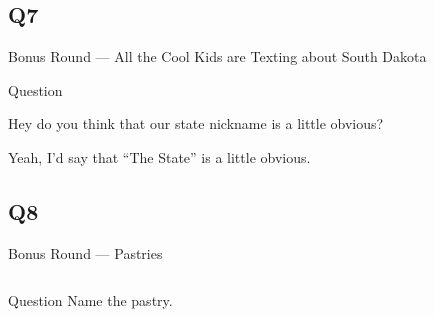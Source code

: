 \documentclass[11pt]{beamer}
\begin{document}
\subsection*{Q7}
\begin{frame}[t]{Bonus Round --- All the Cool Kids are Texting about South Dakota}
\begin{block}{Question}

\begin{minipage}{0.9\textwidth}
\begin{mdframed}[
    roundcorner=7pt,
    backgroundcolor=black!5,
    linecolor=black!5,
    fontcolor=black,
    ignorelastdescenders]
\begin{flushleft}
{\small{}\selectfont{}
Hey do you think that our state nickname is a little obvious?
}
\end{flushleft}
\end{mdframed}
\end{minipage}

\hfill{}\begin{minipage}{0.9\textwidth}
\begin{mdframed}[
    roundcorner=7pt,
    backgroundcolor=blue!80!white,
    linecolor=blue!80!white,
    fontcolor=white,
    ignorelastdescenders]
\begin{flushleft}
{\small{}\selectfont{}
Yeah, I'd say that ``The \textunderscore{}\textunderscore{}\textunderscore{}\textunderscore{}\textunderscore{}\textunderscore{} \textunderscore{}\textunderscore{}\textunderscore{}\textunderscore{}\textunderscore{}\textunderscore{} State'' is a little obvious.
}
\end{flushleft}
\end{mdframed}
\end{minipage}
\end{block}
\end{frame}
\subsection*{Q8}
\begin{frame}[t]{Bonus Round --- Pastries}
\begin{columns}[T,totalwidth=\linewidth]
\begin{column}{0.32\linewidth}
\begin{block}{Question}
Name the pastry.
\end{block}
\end{column}
\begin{column}{0.65\linewidth}
\begin{center}
\texttt{[image: \{Images/cronut]}.jpg}
\end{center}
\end{column}
\end{columns}
\end{frame}
\end{document}
